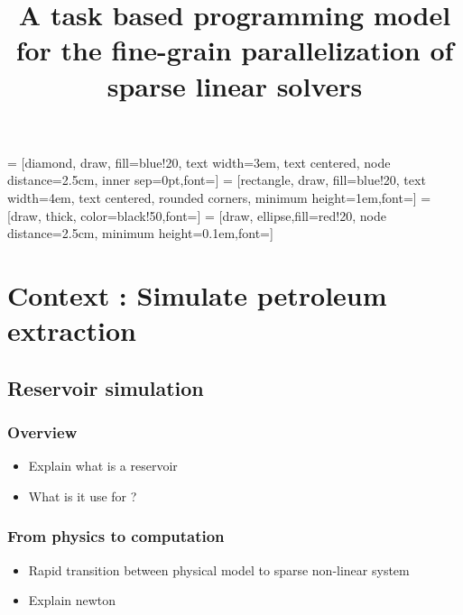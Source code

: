 \documentclass[oneside,12t]{classes/Thesis}
\title{A task based programming model for the fine-grain parallelization of sparse linear solvers}
\begin{document}
\dominitoc
{} = [diamond, draw, fill=blue!20,
text width=3em, text centered, node distance=2.5cm, inner sep=0pt,font=\scriptsize]
 = [rectangle, draw, fill=blue!20,
text width=4em, text centered, rounded corners, minimum height=1em,font=\scriptsize]
 = [draw, thick, color=black!50,font=\scriptsize]
 = [draw, ellipse,fill=red!20, node distance=2.5cm,
minimum height=0.1em,font=\scriptsize]

\maketitle

\setcounter{secnumdepth}{3}
\setcounter{tocdepth}{3}

\frontmatter %
%
%
%
\tableofcontents
\mtcaddchapter
\mainmatter %



\chapter{Context : Simulate petroleum extraction}
\minitoc
\vspace{1cm}

\section{Reservoir simulation}
\subsection{Overview}
  \begin{itemize}
    \item Explain what is a reservoir
    \item What is it use for ?
  \end{itemize}
\subsection{From physics to computation}
  \begin{itemize}
    \item Rapid transition between physical model to sparse non-linear system
    \item Explain newton
  \end{itemize}
\end{document}
